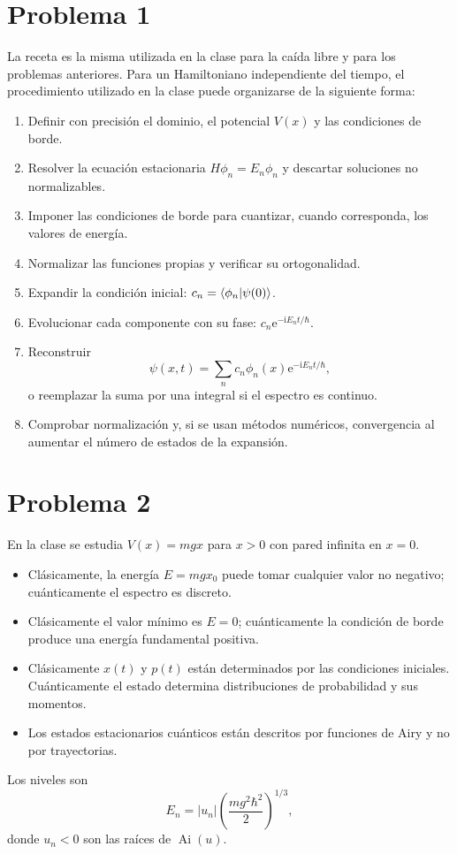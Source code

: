 \documentclass[11pt,a4paper]{article}
\numberwithin{equation}{section}
\renewcommand{\boxed}[1]{#1}
\newcommand{\ii}{\mathrm i}
\newcommand{\e}{\mathrm e}
\newcommand{\hb}{\hbar}
\begin{document}
\section{Problema 1}
La receta es la misma utilizada en la clase para la caída libre y para los problemas anteriores. Para un Hamiltoniano independiente del tiempo, el procedimiento utilizado en la clase puede organizarse de la siguiente forma:
\begin{enumerate}[label=\arabic*.]
\item Definir con precisión el dominio, el potencial $V(x)$ y las condiciones de borde.
\item Resolver la ecuación estacionaria $H\phi_n=E_n\phi_n$ y descartar soluciones no normalizables.
\item Imponer las condiciones de borde para cuantizar, cuando corresponda, los valores de energía.
\item Normalizar las funciones propias y verificar su ortogonalidad.
\item Expandir la condición inicial: $c_n=\braket{\phi_n|\psi(0)}$.
\item Evolucionar cada componente con su fase: $c_n\e^{-\ii E_nt/\hb}$.
\item Reconstruir
\begin{equation}
\boxed{\psi(x,t)=\sum_n c_n\phi_n(x)\e^{-\ii E_nt/\hb},}
\end{equation}
o reemplazar la suma por una integral si el espectro es continuo.
\item Comprobar normalización y, si se usan métodos numéricos, convergencia al aumentar el número de estados de la expansión.
\end{enumerate}

\section{Problema 2}
En la clase se estudia $V(x)=mgx$ para $x>0$ con pared infinita en $x=0$.
\begin{itemize}
\item Clásicamente, la energía $E=mgx_0$ puede tomar cualquier valor no negativo; cuánticamente el espectro es discreto.
\item Clásicamente el valor mínimo es $E=0$; cuánticamente la condición de borde produce una energía fundamental positiva.
\item Clásicamente $x(t)$ y $p(t)$ están determinados por las condiciones iniciales. Cuánticamente el estado determina distribuciones de probabilidad y sus momentos.
\item Los estados estacionarios cuánticos están descritos por funciones de Airy y no por trayectorias.
\end{itemize}
Los niveles son
\begin{equation}
E_n=|u_n|\left(\frac{mg^2\hb^2}{2}\right)^{1/3},
\end{equation}
donde $u_n<0$ son las raíces de $\operatorname{Ai}(u)$.
\end{document}
